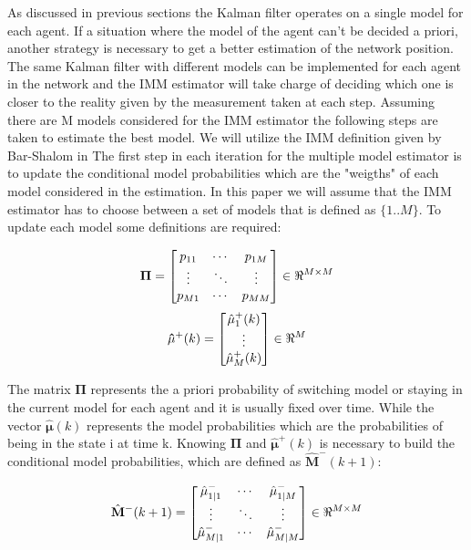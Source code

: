 \documentclass[conference]{IEEEtran}
\begin{document}
As discussed in previous sections the Kalman filter operates on a single model for each agent. If a situation where the model of the agent can't be decided a priori, another strategy is necessary to get a better estimation of the network position. The same Kalman filter with different models can be implemented for each agent in the network and the IMM estimator will take charge of deciding which one is closer to the reality given by the measurement taken at each step. Assuming there are M models considered for the IMM estimator the following steps are taken to estimate the best model. We will utilize the IMM definition given by Bar-Shalom in \cite{Bar-Shalom}
The first step in each iteration for the multiple model estimator is to update the conditional model probabilities which are the "weigths" of each model considered in the estimation. In this paper we will assume that the IMM estimator has to choose between a set of models that is defined as $\{1..M\}$.
To update each model some definitions are required:

$$ \mathbf{\Pi} = \begin{bmatrix} p_{11} & \cdots & p_{1M} \\ \vdots & \ddots & \vdots \\ p_{M1} & \cdots & p_{MM} \end{bmatrix} \in \real^{M \times M} $$
$$ \mathbf{\hat{\mu}}^{+}(k) = \begin{bmatrix} \hat{\mu}_{1}^{+}(k) \\ \vdots \\ \hat{\mu}_{M}^{+}(k)  \end{bmatrix} \in \real^{M}$$

The matrix $ \mathbf{\Pi} $ represents the a priori probability of switching model or staying in the current model for each agent and it is usually fixed over time. While the vector $ \hat{\mathbf{\mu}}(k)$ represents the model probabilities which are the probabilities of being in the state i at time k.
Knowing $ \mathbf{\Pi} $ and  $ \hat{\mathbf{\mu}}^{+}(k)$ is necessary to build the conditional model probabilities, which are defined as $\mathbf{\hat{M}}^{-}(k+1)$:

$$ \hat{ \mathbf{M}}^{-}(k+1) = \begin{bmatrix}  \hat{\mu}_{1|1}^{-} & \cdots &  \hat{\mu}_{1|M}^{-}\\ \vdots & \ddots & \vdots \\  \hat{\mu}_{M|1}^{-} & \cdots &  \hat{\mu}_{M|M}^{-} \end{bmatrix} \in \real^{M\times M} $$
\end{document}
